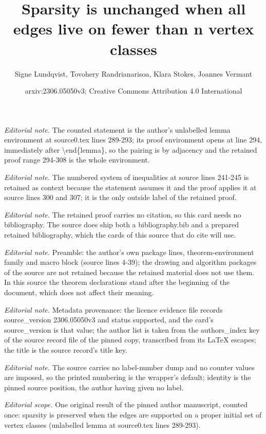 \documentclass[10pt,a4paper]{article}
\title{Sparsity is unchanged when all edges live on fewer than n vertex classes}
\author{Signe Lundqvist, Tovohery Randrianarisoa, Klara Stokes, Joannes Vermant}
\date{arxiv:2306.05050v3; Creative Commons Attribution 4.0 International}
\newtheorem{rem
ark}[theorem]{Remark}
\begin{document}
\maketitle
\noindent\textit{Editorial note.} The counted statement is the author's unlabelled lemma environment at source0.tex lines 289-293; its proof environment opens at line 294, immediately after \textbackslash{}end\{lemma\}, so the pairing is by adjacency and the retained proof range 294-308 is the whole environment.\par\medskip
\noindent\textit{Editorial note.} The numbered system of inequalities at source lines 241-245 is retained as context because the statement assumes it and the proof applies it at source lines 300 and 307; it is the only outside label of the retained proof.\par\medskip
\noindent\textit{Editorial note.} The retained proof carries no citation, so this card needs no bibliography. The source does ship both a bibliography.bib and a prepared retained bibliography, which the cards of this source that do cite will use.\par\medskip
\noindent\textit{Editorial note.} Preamble: the author's own package lines, theorem-environment family and macro block (source lines 4-39); the drawing and algorithm packages of the source are not retained because the retained material does not use them. In this source the theorem declarations stand after the beginning of the document, which does not affect their meaning.\par\medskip
\noindent\textit{Editorial note.} Metadata provenance: the licence evidence file records source\_version 2306.05050v3 and status supported, and the card's source\_version is that value; the author list is taken from the authors\_index key of the source record file of the pinned copy, transcribed from its LaTeX escapes; the title is the source record's title key.\par\medskip
\noindent\textit{Editorial note.} The source carries no label-number dump and no counter values are imposed, so the printed numbering is the wrapper's default; identity is the pinned source position, the author having given no label.\par\medskip
\noindent\textit{Editorial scope.} One original result of the pinned author manuscript, counted once: sparsity is preserved when the edges are supported on a proper initial set of vertex classes (unlabelled lemma at source0.tex lines 289-293).\par\medskip
\end{document}
